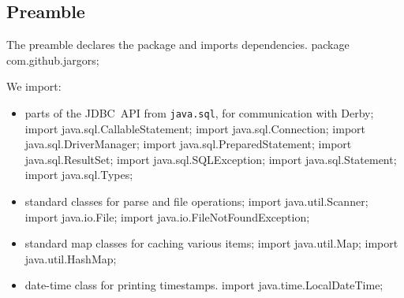 \documentclass{article}
\def\nwendcode{\endtrivlist \endgroup}
\let\nwdocspar=\par
\theoremstyle{definition}
\begin{document}
\subsection{Preamble}
\label{sec:preamble}
The preamble declares the package and imports dependencies.
\nwenddocs{}\endmoddef{}
package com.github.jargors;
\nwendcode{}\nwdocspar
We import:
\begin{itemize}
\item parts of the JDBC~API from {\tt{}java.sql}, for communication with Derby;
\nwenddocs{}\plusendmoddef
import java.sql.CallableStatement;   import java.sql.Connection;
import java.sql.DriverManager;       import java.sql.PreparedStatement;
import java.sql.ResultSet;           import java.sql.SQLException;
import java.sql.Statement;           import java.sql.Types;
\nwendcode{}\item standard classes for parse and file operations;
\nwenddocs{}\plusendmoddef
import java.util.Scanner;
import java.io.File;
import java.io.FileNotFoundException;
\nwendcode{}\item standard map classes for caching various items;
\nwenddocs{}\plusendmoddef
import java.util.Map;
import java.util.HashMap;
\nwendcode{}\item date-time class for printing timestamps.
\nwenddocs{}\plusendmoddef
import java.time.LocalDateTime;
\nwendcode{}\nwdocspar
\end{itemize}
\end{document}
